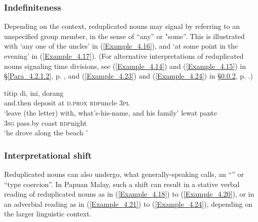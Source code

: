 \z

\subsubsection[Indefiniteness]{Indefiniteness}
\label{Para_4.2.1.3}
Depending on the context, reduplicated nouns may signal  by referring to an unspecified group member, in the sense of ``any'' or "some''. This is illustrated with  ‘any one of the uncles’ in (\ref{Example_4.16}), and  ‘at some point in the evening’ in (\ref{Example_4.17}). (For alternative interpretations of reduplicated nouns signaling time divisions, see (\ref{Example_4.14}) and (\ref{Example_4.15}) in §\ref{Para_4.2.1.2}, p. \pageref{Example_4.14}, and (\ref{Example_4.23}) and (\ref{Example_4.24}) in §\ref{Para_4.2.1.4}, p. \pageref{Example_4.23}.)


\ea
\label{Example_4.16}
 {titip} {di}, {ini}, {} {dorang}\\ %
 and.then  deposit  at  \textsc{d.prox}  \textsc{rdp}{\Tilde}uncle  \textsc{3pl}\\
\glt 
‘leave (the letter) with, what’s-his-name,  and his family’ \textstyleExampleSource{[080922-001a-CvPh.0602]}
\z
\ea
\label{Example_4.17}
 {lewat} {pante} {}\\ %
 \textsc{3sg}  pass.by  coast  \textsc{rdp}{\Tilde}night\\
\glt
‘he drove along the beach ’ \textstyleExampleSource{[081006-020-Cv.0016]}
\z


\subsubsection[Interpretational shift]{Interpretational shift}
\label{Para_4.2.1.4}
Reduplicated nouns can also undergo, what generally-speaking \citet[212]{Booij.2007} calls, an “” or “type coercion”. In Papuan Malay, such a shift can result in a stative verbal reading of reduplicated nouns as in (\ref{Example_4.18}) to (\ref{Example_4.20}), or in an adverbial reading as in (\ref{Example_4.21}) to (\ref{Example_4.24}), depending on the larger linguistic context.




